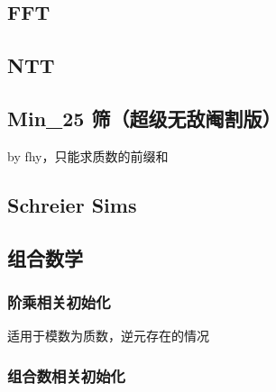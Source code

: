 \documentclass[12pt]{article}
\begin{document}


\newpage

\subsection{FFT}



\newpage

\subsection{NTT}



\newpage


\subsection{Min\_25 筛（超级无敌阉割版）}

by fhy，只能求质数的前缀和



\newpage

\subsection{Schreier Sims}



\newpage

\subsection{组合数学}

\subsubsection{阶乘相关初始化}

适用于模数为质数，逆元存在的情况



\newpage

\subsubsection{组合数相关初始化}
\end{document}
